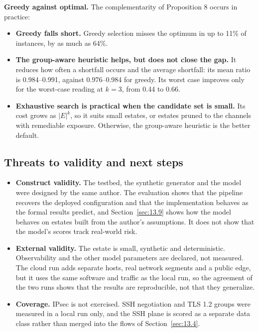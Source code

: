 \documentclass[conference]{IEEEtran}
\begin{document}
\textbf{Greedy against optimal.} The complementarity of Proposition 8 occurs in practice:

\begin{itemize}
\item \textbf{Greedy falls short.} Greedy selection misses the optimum in up to 11\% of instances, by as much as 64\%.
\item \textbf{The group-aware heuristic helps, but does not close the gap.} It reduces how often a shortfall occurs and the average shortfall: its mean ratio is 0.984–0.991, against 0.976–0.984 for greedy. Its worst case improves only for the worst-case reading at $k = 3$, from 0.44 to 0.66.
\item \textbf{Exhaustive search is practical when the candidate set is small.} Its cost grows as $|E|^k$, so it suits small estates, or estates pruned to the channels with remediable exposure. Otherwise, the group-aware heuristic is the better default.
\end{itemize}

\subsection{Threats to validity and next steps}\label{sec:13.10}

\begin{itemize}
\item \textbf{Construct validity.} The testbed, the synthetic generator and the model were designed by the same author. The evaluation shows that the pipeline recovers the deployed configuration and that the implementation behaves as the formal results predict, and Section~\ref{sec:13.9} shows how the model behaves on estates built from the author's assumptions. It does not show that the model's scores track real-world risk.
\item \textbf{External validity.} The estate is small, synthetic and deterministic. Observability and the other model parameters are declared, not measured. The cloud run adds separate hosts, real network segments and a public edge, but it uses the same software and traffic as the local run, so the agreement of the two runs shows that the results are reproducible, not that they generalize.
\item \textbf{Coverage.} IPsec is not exercised. SSH negotiation and TLS 1.2 groups were measured in a local run only, and the SSH plane is scored as a separate data class rather than merged into the flows of Section~\ref{sec:13.4}.
\end{itemize}
\end{document}
